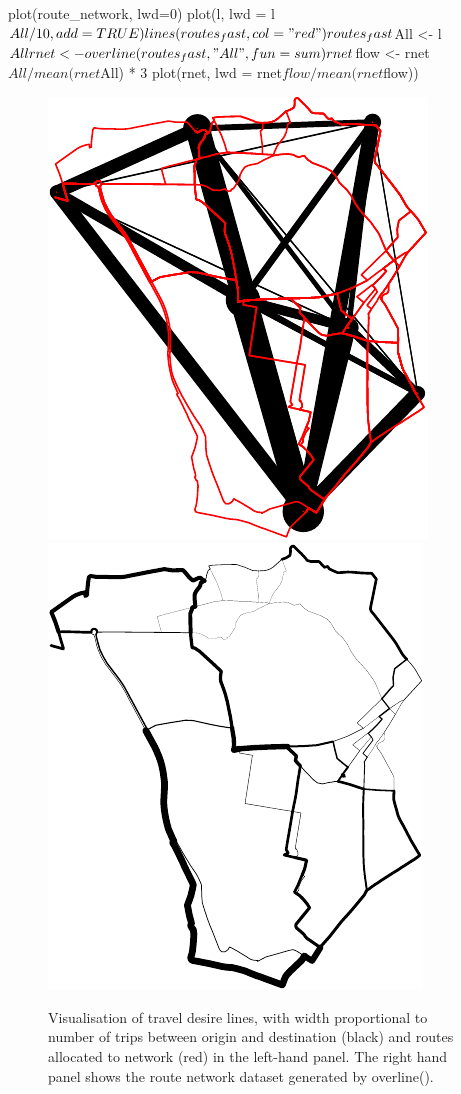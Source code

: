 \begin{Schunk}
\begin{Sinput}
plot(route_network, lwd=0)
plot(l, lwd = l$All / 10, add = TRUE)
lines(routes_fast, col = "red")
routes_fast$All <- l$All
rnet <- overline(routes_fast, "All", fun = sum)
rnet$flow <- rnet$All / mean(rnet$All) * 3
plot(rnet, lwd = rnet$flow / mean(rnet$flow))
\end{Sinput}
\begin{figure}
\includegraphics[width=0.5\linewidth]{lines_routes-1} \includegraphics[width=0.5\linewidth]{lines_routes-2} \caption[Visualisation of travel desire lines, with width proportional to number of trips between origin and destination (black) and routes allocated to network  (red) in the left-hand panel]{Visualisation of travel desire lines, with width proportional to number of trips between origin and destination (black) and routes allocated to network  (red) in the left-hand panel. The right hand panel shows the route network dataset generated by overline().}\label{fig:lines_routes}
\end{figure}
\end{Schunk}

